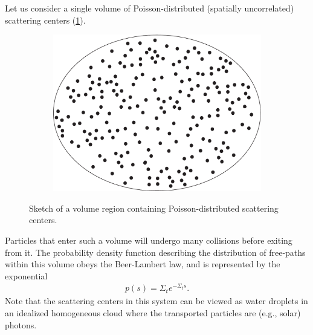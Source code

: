 \documentclass[12pt]{article}
\begin{document}
Let us consider a single volume of Poisson-distributed (spatially uncorrelated) scattering centers (\cref{fig1}).
\begin{figure}[hbt]
    \centering
    \begin{subfigure}{0.2\textwidth}
        \centering
        \includegraphics[width=\textwidth]{Fig1a}
    \end{subfigure}
 \caption{Sketch of a volume region containing Poisson-distributed scattering centers.}
    \label{fig1}
\end{figure}
Particles that enter such a volume will undergo many collisions before exiting from it. The probability density function describing the distribution of free-paths within this volume obeys the Beer-Lambert law, and is represented by the exponential
\begin{align}\label{eq1}
p(s) = \Sigma_t e^{-\Sigma_t s}.
\end{align}
Note that the scattering centers in this system can be viewed as water droplets in an idealized homogeneous cloud where the transported particles are (e.g., solar) photons.
\end{document}
